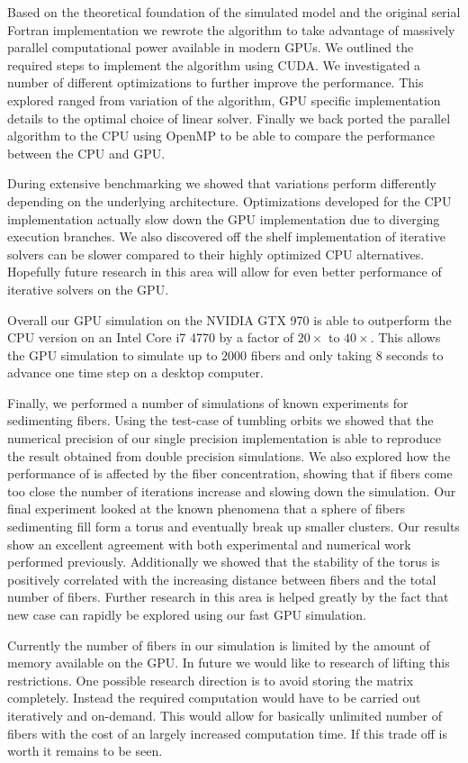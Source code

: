 \documentclass[a4paper,11pt]{kth-mag}
\begin{document}
Based on the theoretical foundation of the simulated model and the original serial Fortran implementation we rewrote the algorithm to take advantage of massively parallel computational power available in modern GPUs. We outlined the required steps to implement the algorithm using CUDA. We investigated a number of different optimizations to further improve the performance. This explored ranged from variation of the algorithm, GPU specific implementation details to the optimal choice of linear solver. Finally we back ported the parallel algorithm to the CPU using OpenMP to be able to compare the performance between the CPU and GPU.

During extensive benchmarking we showed that variations perform differently depending on the underlying architecture. Optimizations developed for the CPU implementation actually slow down the GPU implementation due to diverging execution branches. We also discovered off the shelf implementation of iterative solvers can be slower compared to their highly optimized CPU alternatives. Hopefully future research in this area will allow for even better performance of iterative solvers on the GPU.

Overall our GPU simulation on the NVIDIA GTX 970 is able to outperform the CPU version on an Intel Core i7 4770 by a factor of $20×$ to $40×$. This allows the GPU simulation to simulate up to $2000$ fibers and only taking $8$ seconds to advance one time step on a desktop computer.

Finally, we performed a number of simulations of known experiments for sedimenting fibers. Using the test-case of tumbling orbits we showed that the numerical precision of our single precision implementation is able to reproduce the result obtained from double precision simulations. We also explored how the performance of is affected by the fiber concentration, showing that if fibers come too close the number of iterations increase and slowing down the simulation. Our final experiment looked at the known phenomena that a sphere of fibers sedimenting fill form a torus and eventually break up smaller clusters. Our results show an excellent agreement with both experimental and numerical work performed previously. Additionally we showed that the stability of the torus is positively correlated with the increasing distance between fibers and the total number of fibers. Further research in this area is helped greatly by the fact that new case can rapidly be explored using our fast GPU simulation.

Currently the number of fibers in our simulation is limited by the amount of memory available on the GPU. In future we would like to research of lifting this restrictions. One possible research direction is to avoid storing the matrix completely. Instead the required computation would have to be carried out iteratively and on-demand. This would allow for basically unlimited number of fibers with the cost of an largely increased computation time. If this trade off is worth it remains to be seen.
\end{document}
